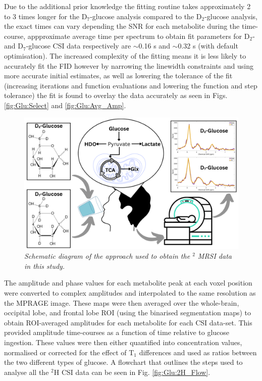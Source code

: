 Due to the additional prior knowledge the fitting routine takes approximately 2 to 3 times longer for the D$_7$-glucose analysis compared to the D$_2$-glucose analysis, the exact times can vary depending the SNR for each metabolite during the time-course, appproximate average time per spectrum to obtain fit parameters for D$_2$- and D$_7$-glucose \ac{CSI} data respectively are $\sim$0.16 s and $\sim$0.32 s (with default optimisation). The increased complexity of the fitting means it is less likely to accurately fit the \ac{FID} however by narrowing the linewidth constraints and using more accurate initial estimates, as well as lowering the tolerance of the fit (increasing iterations and function evaluations and lowering the function and step tolerance) the fit is found to overlay the data accurately as seen in Figs. \ref{fig:Glu:Select} and \ref{fig:Glu:Avg_Amp}. 

\begin{figure}
    \centering
    \includegraphics[width = 1\textwidth]{Figures/Glucose/Study_Day.png}
    \caption{\textit{Schematic diagram of the approach used to obtain the $^2$ MRSI data in this study.}}
    \label{fig:Glu:Study_Day}
\end{figure}

The amplitude and phase values for each metabolite peak at each voxel position were converted to complex amplitudes and interpolated to the same resolution as the \ac{MPRAGE} image. These maps were then averaged over the whole-brain, occipital lobe, and frontal lobe \ac{ROI} (using the binarised segmentation maps) to obtain \ac{ROI}-averaged amplitudes for each metabolite for each \ac{CSI} data-set. This provided amplitude time-courses as a function of time relative to glucose ingestion. These values were then either quantified into concentration values, normalised or corrected for the effect of T$_1$ differences and used as ratios between the two different types of glucose. A flowchart that outlines the steps used to analyse all the $^2$H \ac{CSI} data can be seen in Fig. \ref{fig:Glu:2H_Flow}.

